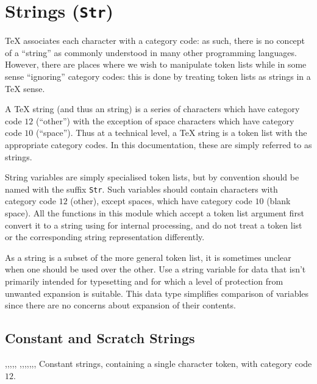 \documentclass[oneside]{book}
\begin{document}
\chapter{Strings (\texttt{Str})}

\TeX{} associates each character with a category code: as such, there is no
concept of a \enquote{string} as commonly understood in many other
programming languages. However, there are places where we wish to manipulate
token lists while in some sense \enquote{ignoring} category codes: this is
done by treating token lists as strings in a \TeX{} sense.

A \TeX{} string (and thus an  string) is a series of characters
which have category code $12$ (\enquote{other}) with the exception of
space characters which have category code $10$ (\enquote{space}). Thus
at a technical level, a \TeX{} string is a token list with the appropriate
category codes. In this documentation, these are simply referred to as
strings.

String variables are simply specialised token lists, but by convention
should be named with the suffix \texttt{Str}.  Such variables
should contain characters with category code $12$ (other), except
spaces, which have category code $10$ (blank space).  All the
functions in this module which accept a token list argument first
convert it to a string using  for internal processing,
and do not treat a token list or the corresponding string
representation differently.

As a string is a subset of the more general token list, it is sometimes unclear
when one should be used over the other.
Use a string variable for data that isn't primarily intended for typesetting
and for which a level of protection from unwanted expansion is suitable.
This data type simplifies comparison of variables since there are no concerns
about expansion of their contents.


\section{Constant and Scratch Strings}

\begin{variable}{\cAmpersandStr,\cAtsignStr,\cBackslashStr,\cLeftBraceStr,\cRightBraceStr,
\cCircumflexStr,\cColonStr,\cDollarStr,\cHashStr,\cPercentStr,\cTildeStr,\cUnderscoreStr,\cZeroStr}
Constant strings, containing a single character token, with category code $12$.
\end{variable}
\end{document}
